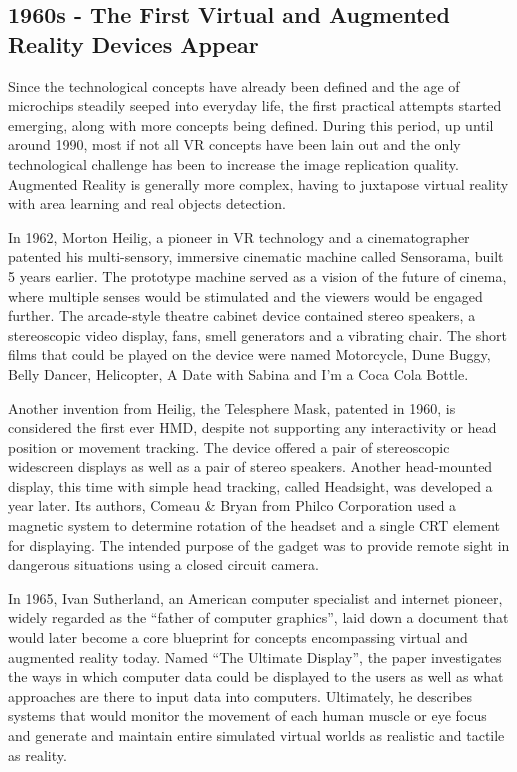 \documentclass[12pt, a4paper]{article}
\begin{document}
\subsection{1960s - The First Virtual and Augmented Reality Devices Appear}
Since the technological concepts have already been defined and the age of microchips steadily seeped into everyday life, the first practical attempts started emerging, along with more concepts being defined. During this period, up until around 1990, most if not all VR concepts have been lain out and the only technological challenge has been to increase the image replication quality. Augmented Reality is generally more complex, having to juxtapose virtual reality with area learning and real objects detection.

In 1962, Morton Heilig, a pioneer in VR technology and a cinematographer patented his multi-sensory, immersive cinematic machine called Sensorama, built 5 years earlier. The prototype machine served as a vision of the future of cinema, where multiple senses would be stimulated and the viewers would be engaged further. The arcade-style theatre cabinet device contained stereo speakers, a stereoscopic video display, fans, smell generators and a vibrating chair. The short films that could be played on the device were named Motorcycle, Dune Buggy, Belly Dancer, Helicopter, A Date with Sabina and I’m a Coca Cola Bottle.

Another invention from Heilig, the Telesphere Mask, patented in 1960, is considered the first ever HMD, despite not supporting any interactivity or head position or movement tracking. The device offered a pair of stereoscopic widescreen displays as well as a pair of stereo speakers. Another head-mounted display, this time with simple head tracking, called Headsight, was developed a year later. Its authors, Comeau \& Bryan from Philco Corporation used a magnetic system to determine rotation of the headset and a single CRT element for displaying. The intended purpose of the gadget was to provide remote sight in dangerous situations using a closed circuit camera.

In 1965, Ivan Sutherland, an American computer specialist and internet pioneer, widely regarded as the “father of computer graphics”, laid down a document that would later become a core blueprint for concepts encompassing virtual and augmented reality today. Named “The Ultimate Display”, the paper investigates the ways in which computer data could be displayed to the users as well as what approaches are there to input data into computers. Ultimately, he describes systems that would monitor the movement of each human muscle or eye focus and generate and maintain entire simulated virtual worlds as realistic and tactile as reality.
\end{document}
